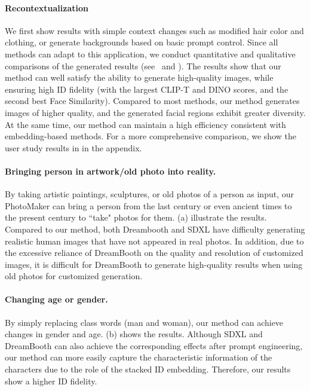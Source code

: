 \paragraph{Recontextualization}
We first show results with simple context changes such as modified hair color and clothing, or generate backgrounds based on basic prompt control. 
Since all methods can adapt to this application, we conduct quantitative and qualitative comparisons of the generated results (see~ and  ). The results show that our method can well satisfy the ability to generate high-quality images, while ensuring high ID fidelity (with the largest CLIP-T and DINO scores, and the second best Face Similarity). 
Compared to most methods, our method generates images of higher quality, and the generated facial regions exhibit greater diversity.
At the same time, 
our method can maintain a high efficiency consistent with embedding-based methods.
For a more comprehensive comparison, we show the user study results in  in the appendix.

\paragraph{Bringing person in artwork/old photo into reality.} 
By taking artistic paintings, sculptures, or old photos of a person as input, our PhotoMaker can bring a person from the last century or even ancient times to the present century to ``take" photos for them.
(a) illustrate the results.
Compared to our method, both Dreambooth and SDXL have difficulty generating realistic human images that have not appeared in real photos.
In addition, due to the excessive reliance of DreamBooth on the quality and resolution of customized images, it is difficult for DreamBooth to generate high-quality results when using old photos for customized generation.


\paragraph{Changing age or gender.} 
By simply replacing class words (\eg man and woman), our method can achieve changes in gender and age.
(b) shows the results.
Although SDXL and DreamBooth can also achieve the corresponding effects after prompt engineering, our method can more easily capture the characteristic information of the characters due to the role of the stacked ID embedding. 
Therefore, our results show a higher ID fidelity.

